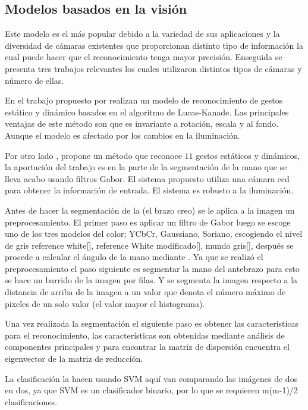\subsection{Modelos basados en la visión}   

Este modelo es el más popular debido a la variedad de sus aplicaciones y la diversidad de cámaras existentes que proporcionan distinto tipo de información la cual puede hacer que el reconocimiento tenga mayor precisión. Enseguida se presenta tres  trabajos relevantes los cuales utilizaron distintos tipos de cámaras y número de ellas. 

En el trabajo propuesto por \cite{Premaratne2013} realizan un modelo de reconocimiento de gestos estático y dinámico basados en el algoritmo de Lucas-Kanade. Las principales ventajas de este método son que es invariante a rotación, escala y al fondo. Aunque el modelo es afectado por los cambios en la iluminación.


Por otro lado \citep{Huang2011}, propone un método que reconoce $11$ gestos estáticos y dinámicos,  la aportación del trabajo es en la parte de la segmentación de la mano que se lleva acabo usando filtros Gabor. El sistema propuesto utiliza una cámara ccd para obtener la información de entrada. El sistema es robusto a la iluminación. 
 
Antes de hacer la segmentación de la (el brazo creo) se le aplica a la imagen un preprocesamiento. El primer paso es aplicar un filtro de Gabor luego  se escoge uno de los tres modelos del color; YCbCr, Gaussiano, Soriano, escogiendo el nivel de gris reference white[], reference White modificado[], mundo gris[], después se procede a calcular el ángulo de la mano mediante .  
Ya que se realizó el preprocesamiento el paso siguiente es segmentar la mano del antebrazo para esto se hace un barrido de la imagen por filas. Y se segmenta la imagen respecto a la distancia de arriba de la imagen a un valor que denota el número máximo de pixeles de un solo valor (el valor mayor el histograma).

Una vez realizada la segmentación el siguiente paso es obtener las características para el reconocimiento, las características son obtenidas mediante análisis de componentes principales y para encontrar la matriz de dispersión encuentra el eigenvector de la matriz de reducción. 

La clasificación la hacen usando SVM aquí van comparando las imágenes de dos en dos, ya que SVM es un clasificador binario, por lo que se requieren m(m-1)/2 clasificaciones.   

